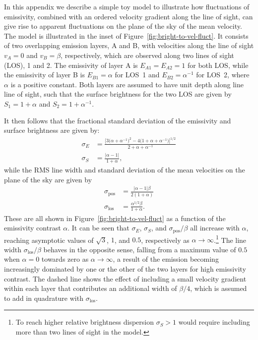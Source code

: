\documentclass[fleqn,usenatbib, useAMS, a4paper]{mnras}
\newcommand\pos{\ensuremath{_{\mathrm{pos}}}}
\newcommand\los{\ensuremath{_{\mathrm{los}}}}
\begin{document}
In this appendix we describe a simple toy model to illustrate
how fluctuations of emissivity,
combined with an ordered velocity gradient along the line of sight,
can give rise to apparent fluctuations on the plane of the sky
of the mean velocity.
The model is illustrated in the inset of Figure~\ref{fig:bright-to-vel-fluct}.
It consists of two overlapping emission layers, A and B,
with velocities along the line of sight \(v_A = 0\) and \(v_B = \beta\), respectively,
which are observed along two lines of sight (LOS), 1 and 2.
The emissivity of layer A is \(E_{A1} = E_{A2} = 1\) for both LOS,
while the emissivity of layer B is \(E_{B1} = \alpha\) for LOS~1
and \(E_{B2} = \alpha^{-1}\) for LOS~2, where \(\alpha\) is a positive constant.
Both layers are assumed to have unit depth along line line of sight,
such that the surface brightness for the two LOS are given by
\(S_1 = 1 + \alpha\) and \(S_2 = 1 + \alpha^{-1}\).


It then follows that the fractional standard deviation of the emissivity
and surface brightness are given by:
\begin{align}
  \label{eq:toy}
  \sigma_E &=
  \frac{
    \bigl[ 3\bigl(\alpha + \alpha^{-1}\bigr)^2 - 4\bigl(1 + \alpha + \alpha^{-1}\bigr)\bigr]^{1/2}
  }{
    2 + \alpha + \alpha^{-1}
  }
  \\
  \sigma_S &=   \frac{\vert\alpha - 1\vert}{1 + \alpha} ,
\end{align}
while the RMS line width and standard deviation of the mean velocities on the plane of the sky
are given by
\begin{align}
  \label{eq:toy}
  \sigma\pos &=\frac{\vert\alpha - 1\vert \beta}{2 (1 + \alpha)}
  \\
  \sigma\los &=   \frac{\alpha^{1/2}\beta}{1 + \alpha}.
\end{align}
These are all shown in Figure~\ref{fig:bright-to-vel-fluct} as a function
of the emissivity contrast \(\alpha\).
It can be seen that \(\sigma_E\), \(\sigma_S\), and \(\sigma\pos/\beta\) all increase with \(\alpha\),
reaching asymptotic values of \(\sqrt{3}\), \(1\), and \(0.5\),
respectively as \(\alpha \to \infty\).\footnote{%
  To reach higher relative brightness dispersion \(\sigma_S > 1\) would require
  including more than two lines of sight in the model.
}
The line width \(\sigma\los/\beta\) behaves in the opposite sense, falling from
a maximum value of \(0.5\) when \(\alpha = 0\) towards zero as \(\alpha \to \infty\),
a result of the emission becoming increasingly dominated by one
or the other of the two layers for high emissivity contrast.
The dashed line shows the effect of including a small velocity gradient
within each layer that contributes an additional width of \(\beta/4\),
which is assumed to add in quadrature with \(\sigma\los\).
\end{document}
